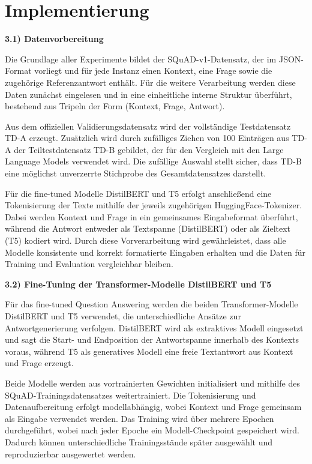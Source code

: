 \documentclass[12pt,oneside]{article}
\begin{document}
  \section{Implementierung}
  
  \textbf{3.1) Datenvorbereitung}

Die Grundlage aller Experimente bildet der SQuAD-v1-Datensatz, der im
JSON-Format vorliegt und für jede Instanz einen Kontext, eine Frage
sowie die zugehörige Referenzantwort enthält. Für die weitere
Verarbeitung werden diese Daten zunächst eingelesen und in eine
einheitliche interne Struktur überführt, bestehend aus Tripeln der Form
(Kontext, Frage, Antwort).

Aus dem offiziellen Validierungsdatensatz wird der vollständige
Testdatensatz TD-A erzeugt. Zusätzlich wird durch zufälliges Ziehen von
100 Einträgen aus TD-A der Teiltestdatensatz TD-B gebildet, der für den
Vergleich mit den Large Language Models verwendet wird. Die zufällige
Auswahl stellt sicher, dass TD-B eine möglichst unverzerrte Stichprobe
des Gesamtdatensatzes darstellt.

Für die fine-tuned Modelle DistilBERT und T5 erfolgt anschließend eine
Tokenisierung der Texte mithilfe der jeweils zugehörigen
HuggingFace-Tokenizer. Dabei werden Kontext und Frage in ein gemeinsames
Eingabeformat überführt, während die Antwort entweder als Textspanne
(DistilBERT) oder als Zieltext (T5) kodiert wird. Durch diese
Vorverarbeitung wird gewährleistet, dass alle Modelle konsistente und
korrekt formatierte Eingaben erhalten und die Daten für Training und
Evaluation vergleichbar bleiben.

\textbf{3.2) Fine-Tuning der Transformer-Modelle DistilBERT und T5}

Für das fine-tuned Question Answering werden die beiden
Transformer-Modelle DistilBERT und T5 verwendet, die unterschiedliche
Ansätze zur Antwortgenerierung verfolgen. DistilBERT wird als
extraktives Modell eingesetzt und sagt die Start- und Endposition der
Antwortspanne innerhalb des Kontexts voraus, während T5 als generatives
Modell eine freie Textantwort aus Kontext und Frage erzeugt.

Beide Modelle werden aus vortrainierten Gewichten initialisiert und
mithilfe des SQuAD-Trainingsdatensatzes weitertrainiert. Die
Tokenisierung und Datenaufbereitung erfolgt modellabhängig, wobei
Kontext und Frage gemeinsam als Eingabe verwendet werden. Das Training
wird über mehrere Epochen durchgeführt, wobei nach jeder Epoche ein
Modell-Checkpoint gespeichert wird. Dadurch können unterschiedliche
Trainingsstände später ausgewählt und reproduzierbar ausgewertet werden.
\end{document}
